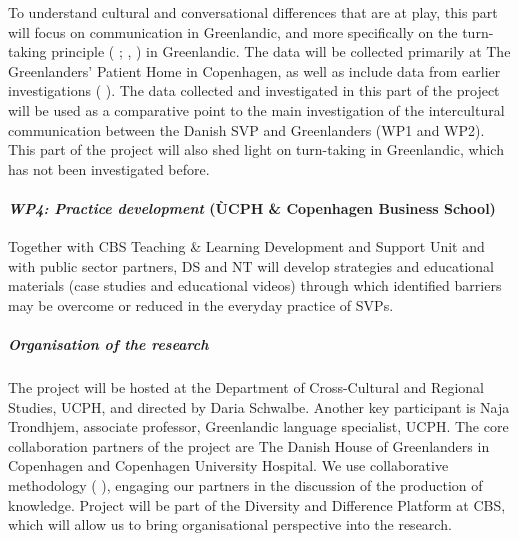 \documentclass[twocolumn, serif, rga, authordate]{jote-article}
\begin{document}
To understand cultural and conversational differences that are at play, this part will focus on communication in Greenlandic, and more specifically on the turn-taking principle ( \citeyear{Tanen2012}; , \citeyear{Steensig2011}) in Greenlandic. The data will be collected primarily at The Greenlanders'
Patient Home in Copenhagen, as well as include data from earlier investigations ( \citeyear{Trondhjem2008}). The data collected and investigated in this part of the project will be used as a comparative point to the main investigation of the intercultural communication between the Danish SVP and Greenlanders (WP1 and WP2). This part of the project will also shed light on turn-taking in Greenlandic, which has not been investigated before.

\paragraph{\emph{WP4: Practice development} (ÙCPH \& Copenhagen Business School)}
Together with CBS Teaching \& Learning Development and Support Unit and with public sector partners, DS and NT will develop strategies and educational materials
(case studies and educational videos) through which identified barriers may be overcome or reduced in the everyday practice of SVPs.

\subparagraph{Organisation of the research}

The project will be hosted at the Department of Cross-Cultural and Regional Studies, UCPH, and directed by Daria Schwalbe. Another key participant is Naja Trondhjem, associate professor, Greenlandic language specialist, UCPH. The core collaboration partners of the project are The Danish House of Greenlanders in Copenhagen and Copenhagen University Hospital. We use collaborative methodology ( \citeyear{Phillips2018}), engaging our partners in the discussion of the production of knowledge. Project will be part of the Diversity and Difference Platform at CBS, which will allow us to bring organisational perspective into the research.
\end{document}
